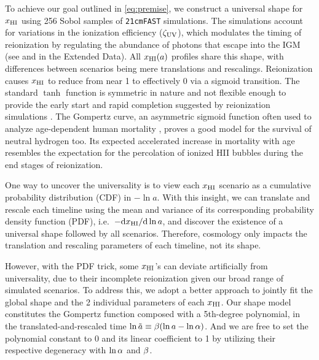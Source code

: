 To achieve our goal outlined in \cref{eq:premise}, we construct a
universal shape for $x_{\mathrm{HI}}$ using 256 Sobol samples of \texttt{21cmFAST} simulations. 
The simulations account for variations in the ionization efficiency ($\zeta_\mathrm{UV}$), 
which modulates the timing of reionization by regulating the abundance
of photons that escape into the IGM 
(see  and  in the Extended Data). 
All $x_{\mathrm{HI}}(a)$ profiles share this shape, with differences between
scenarios being mere translations and rescalings.
Reionization causes $x_{\mathrm{HI}}$ to reduce from near 1 to effectively 0 via a
sigmoid transition.
The standard $\tanh$ function is symmetric in nature and not flexible
enough to provide the early start and rapid completion suggested by
reionization simulations \cite{Trac2018, Doussot2019}.
The Gompertz curve, an asymmetric sigmoid function often used to analyze
age-dependent human mortality \cite{Gompertz1825}, proves a good model
for the survival of neutral hydrogen too.
Its expected accelerated increase in mortality with age resembles the
expectation for the percolation of ionized HII bubbles during the end
stages of reionization.

One way to uncover the universality is to view each $x_{\mathrm{HI}}$ scenario as
a cumulative probability distribution (CDF) in $- \ln a$.
With this insight, we can translate and rescale each timeline using the
mean and variance of its corresponding probability density function
(PDF), i.e.\ $- \mathrm{d}x_{\mathrm{HI}} / \mathrm{d}\ln a$, and discover the
existence of a universal shape followed by all scenarios.
Therefore, cosmology only impacts the translation and rescaling
parameters of each timeline, not its shape.

However, with the PDF trick, some $x_{\mathrm{HI}}$'s can deviate artificially
from universality, due to their incomplete reionization given our broad
range of simulated scenarios.
To address this, we adopt a better approach to jointly fit the global
shape and the 2 individual parameters of each $x_{\mathrm{HI}}$.
Our shape model constitutes the Gompertz function composed with a
5th-degree polynomial, in the translated-and-rescaled time $\ln\tilde{a}
\equiv \beta (\ln a - \ln\alpha)$.
And we are free to set the polynomial constant to 0 and its linear
coefficient to 1 by utilizing their respective degeneracy with $\ln\alpha$
and $\beta$.

